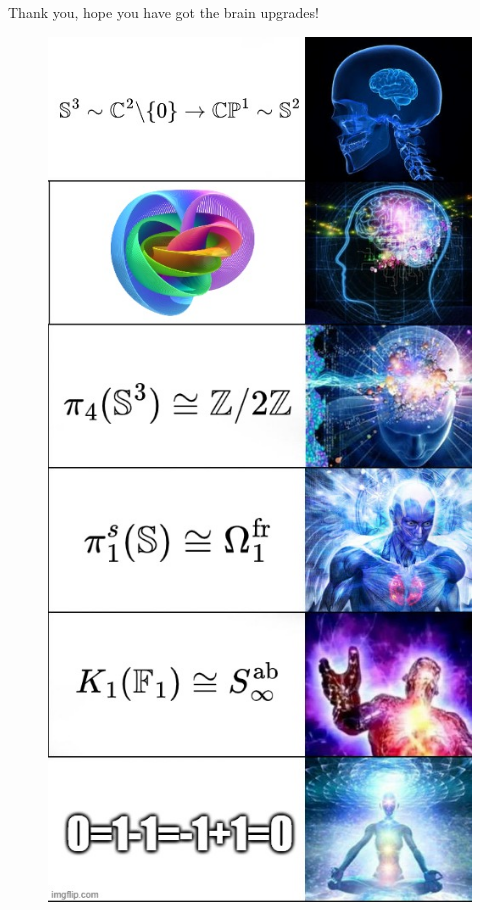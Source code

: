 \documentclass[12pt]{beamer}
\begin{document}
\begin{frame}{Thank you, hope you have got the brain upgrades!}
\begin{figure}
\begin{center}
    \includegraphics[height=0.8\textheight]{figures/hopf_meme.jpg}
  \end{center}
\end{figure}

\end{frame}
\end{document}
